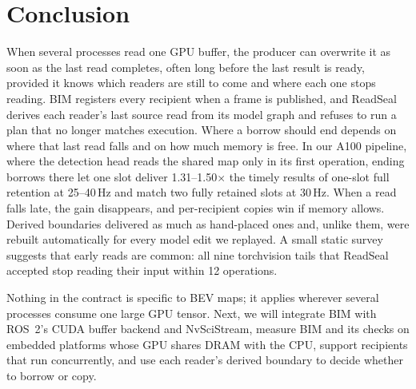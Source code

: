 \documentclass[conference]{IEEEtran}
\newcommand{\Hz}{\,Hz}
\begin{document}
\section{Conclusion}

When several processes read one GPU buffer, the producer can overwrite it as soon as the last read completes, often long before the last result is ready, provided it knows which readers are still to come and where each one stops reading. BIM registers every recipient when a frame is published, and ReadSeal derives each reader's last source read from its model graph and refuses to run a plan that no longer matches execution. Where a borrow should end depends on where that last read falls and on how much memory is free. In our A100 pipeline, where the detection head reads the shared map only in its first operation, ending borrows there let one slot deliver 1.31--1.50$\times$ the timely results of one-slot full retention at 25--40\Hz{} and match two fully retained slots at 30\Hz. When a read falls late, the gain disappears, and per-recipient copies win if memory allows. Derived boundaries delivered as much as hand-placed ones and, unlike them, were rebuilt automatically for every model edit we replayed. A small static survey suggests that early reads are common: all nine torchvision tails that ReadSeal accepted stop reading their input within 12 operations.

Nothing in the contract is specific to BEV maps; it applies wherever several processes consume one large GPU tensor. Next, we will integrate BIM with ROS~2's CUDA buffer backend and NvSciStream, measure BIM and its checks on embedded platforms whose GPU shares DRAM with the CPU, support recipients that run concurrently, and use each reader's derived boundary to decide whether to borrow or copy.





\end{document}
